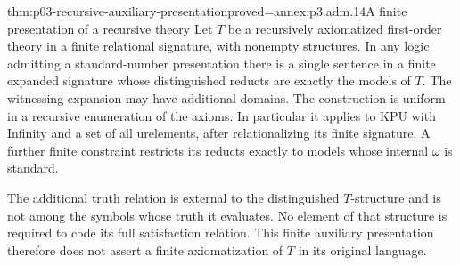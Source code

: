 \begin{hbtheorem}{thm:p03-recursive-auxiliary-presentation}{proved=annex:p3.adm.14}{A finite presentation of a recursive theory}
Let \(T\) be a recursively axiomatized first-order theory in a finite
relational signature, with nonempty structures. In any logic admitting a
standard-number presentation there is a single sentence in a finite
expanded signature whose distinguished reducts are exactly the models
of \(T\). The witnessing expansion may have additional domains.
The construction is uniform in a recursive enumeration of the axioms.
In particular it applies to \(\mathrm{KPU}\) with Infinity and a set of
all urelements, after relationalizing its finite signature. A further
finite constraint restricts its reducts exactly to models whose internal
\(\omega\) is standard.

The additional truth relation is external to the distinguished
\(T\)-structure and is not among the symbols whose truth it evaluates.
No element of that structure is required to code its full satisfaction
relation. This finite auxiliary presentation therefore does not assert
a finite axiomatization of \(T\) in its original language.
\end{hbtheorem}
